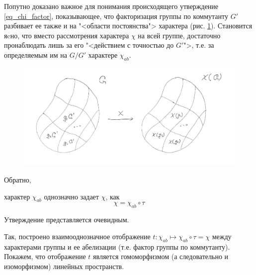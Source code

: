    \begin{remark} Попутно доказано важное для понимания происходящего 
        утверждение \eqref{eq_chi_factor}, показывающее, что факторизация 
        группы по коммутанту $G'$ разбивает ее также и на "<области постоянства"> 
        характера (рис. \ref{img_chi_factor}). Становится яcно, что вместо 
        рассмотрения характера $\chi$ на всей группе, достаточно пронаблюдать 
        лишь за его "<действием с точностью до $G'$">, т.е. за определяемым им 
        на $G/G'$ характере $\chi_{ab}$.
    \end{remark}
    
    \begin{figure}[th]
        \centering
        \includegraphics[width=\textwidth]{pictures/chips}
        \caption{}
        \label{img_chi_factor}
    \end{figure}

    \newpage
    Обратно,
    \begin{statement} характер $\chi_{ab}$ однозначно задает $\chi$, как 
        \[\chi = \chi_{ab}\circ \tau\]
    \end{statement}
    Утверждение представляется очевидным.

    Так, построено взаимооднозначное отображение $t: \chi_{ab} \mapsto 
    \chi_{ab} \circ \tau = \chi$ между характерами группы и ее абелизации 
    (т.е. фактор группы по коммутанту). Покажем, что отображение $t$ является 
    гомоморфизмом (а следовательно и изоморфизмом) линейных пространств.

